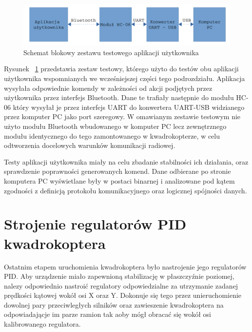\begin{figure}[H]
	\centering
	\includegraphics[scale=0.2]{Pictures/TestyAplikacji.png}
	\caption[Schemat blokowy zestawu testowego aplikacji użytkownika]{Schemat blokowy zestawu testowego aplikacji użytkownika}
	\label{fig:UserAplication_test}
\end{figure}

Rysunek ~\ref{fig:UserAplication_test} przedstawia zestaw testowy, którego użyto do testów obu aplikacji użytkownika wspomnianych we wcześniejszej części tego podrozdziału. Aplikacja wysyłała odpowiednie komendy w zależności od akcji podjętych przez użytkownika przez interfejs Bluetooth. Dane te trafiały następnie do modułu HC-06 który wysyłał je przez interfejs UART do konwertera UART-USB widzianego przez komputer PC jako port szeregowy. W omawianym zestawie testowym nie użyto modułu Bluetooth wbudowanego w komputer PC lecz zewnętrznego modułu identycznego do tego zamontowanego w kwadrokopterze, w celu odtworzenia docelowych warunków komunikacji radiowej. 

Testy aplikacji użytkownika miały na celu zbadanie stabilności ich działania, oraz sprawdzenie poprawności generowanych komend. Dane odbierane po stronie komputera PC wyświetlane były w postaci binarnej i analizowane pod kątem zgodności z definicją protokołu komunikacyjnego oraz logicznej spójności danych.

\section{Strojenie regulatorów PID kwadrokoptera}

Ostatnim etapem uruchomienia kwadrokoptera było nastrojenie jego regulatorów PID. Aby urządzenie miało zapewnioną stabilizację w płaszczyźnie poziomej, nalezy odpowiednio nastroić regulatory odpowiedzialne za utrzymanie zadanej prędkości kątowej wokół osi X oraz Y. Dokonuje się tego przez unieruchomienie dowolnej pary przeciwległych silników oraz zawieszenie kwadrokoptera na odpowiadającje im parze ramion tak aoby mógł obracać się wokół osi kalibrowanego regulatora.


